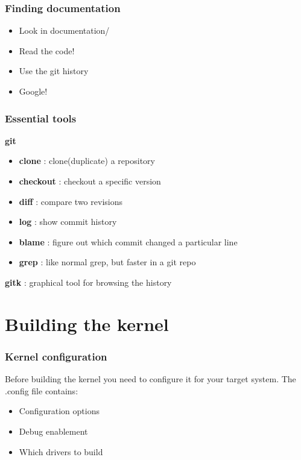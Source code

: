 \documentclass{beamer}
\begin{document}
\begin{frame}
\frametitle{Finding documentation}
\begin{itemize}
	\item Look in documentation/
	\item Read the code!
	\item Use the git history
	\item Google!
\end{itemize}
\end{frame}

\begin{frame}
\frametitle{Essential tools}
\textbf{git}
\begin{itemize}
	\item \textbf{clone} : clone(duplicate) a repository \\
	\item \textbf{checkout} : checkout a specific version\\
	\item \textbf{diff} : compare two revisions\\
	\item \textbf{log} : show commit history\\
	\item \textbf{blame} : figure out which commit changed a particular line\\
	\item \textbf{grep} : like normal grep, but faster in a git repo \\ 
\end{itemize}
\textbf{gitk} : graphical tool for browsing the history
\end{frame}

\section{Building the kernel}

\begin{frame}
\frametitle{Kernel configuration}
Before building the kernel you need to configure it for your target system.
The .config file contains:
\begin{itemize}
	\item Configuration options
	\item Debug enablement
	\item Which drivers to build
\end{itemize}
\end{frame}
\end{document}

